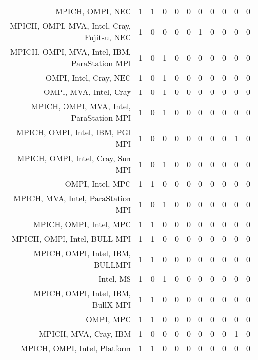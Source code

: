 {\begin{landscape}
\begin{longtable}[htb]{r|c|c|c|c|c|c|c|c|c|c}
{MPICH, OMPI, NEC} & 1 & 1 & 0 & 0 & 0 & 0 & 0 & 0 & 0 & 0 \\%
{MPICH, OMPI, MVA, Intel, Cray, Fujitsu, NEC} & 1 & 0 & 0 & 0 & 0 & 1 & 0 & 0 & 0 & 0 \\%
{MPICH, OMPI, MVA, Intel, IBM, ParaStation MPI} & 1 & 0 & 1 & 0 & 0 & 0 & 0 & 0 & 0 & 0 \\%
{OMPI, Intel, Cray, NEC} & 1 & 0 & 1 & 0 & 0 & 0 & 0 & 0 & 0 & 0 \\%
{OMPI, MVA, Intel, Cray} & 1 & 0 & 1 & 0 & 0 & 0 & 0 & 0 & 0 & 0 \\%
{MPICH, OMPI, MVA, Intel, ParaStation MPI} & 1 & 0 & 1 & 0 & 0 & 0 & 0 & 0 & 0 & 0 \\%
{MPICH, OMPI, Intel, IBM, PGI MPI} & 1 & 0 & 0 & 0 & 0 & 0 & 0 & 0 & 1 & 0 \\%
{MPICH, OMPI, Intel, Cray, Sun MPI} & 1 & 0 & 1 & 0 & 0 & 0 & 0 & 0 & 0 & 0 \\%
{OMPI, Intel, MPC} & 1 & 1 & 0 & 0 & 0 & 0 & 0 & 0 & 0 & 0 \\%
{MPICH, MVA, Intel, ParaStation MPI} & 1 & 0 & 1 & 0 & 0 & 0 & 0 & 0 & 0 & 0 \\%
{MPICH, OMPI, Intel, MPC} & 1 & 1 & 0 & 0 & 0 & 0 & 0 & 0 & 0 & 0 \\%
{MPICH, OMPI, Intel, BULL MPI} & 1 & 1 & 0 & 0 & 0 & 0 & 0 & 0 & 0 & 0 \\%
{MPICH, OMPI, Intel, IBM, BULLMPI} & 1 & 1 & 0 & 0 & 0 & 0 & 0 & 0 & 0 & 0 \\%
{Intel, MS} & 1 & 0 & 1 & 0 & 0 & 0 & 0 & 0 & 0 & 0 \\%
{MPICH, OMPI, Intel, IBM, BullX-MPI} & 1 & 1 & 0 & 0 & 0 & 0 & 0 & 0 & 0 & 0 \\%
{OMPI, MPC} & 1 & 1 & 0 & 0 & 0 & 0 & 0 & 0 & 0 & 0 \\%
{MPICH, MVA, Cray, IBM} & 1 & 0 & 0 & 0 & 0 & 0 & 0 & 0 & 1 & 0 \\%
{MPICH, OMPI, Intel, Platform} & 1 & 1 & 0 & 0 & 0 & 0 & 0 & 0 & 0 & 0 \\%
\hline%
\end{longtable}%
\end{landscape}}%
\clearpage%
